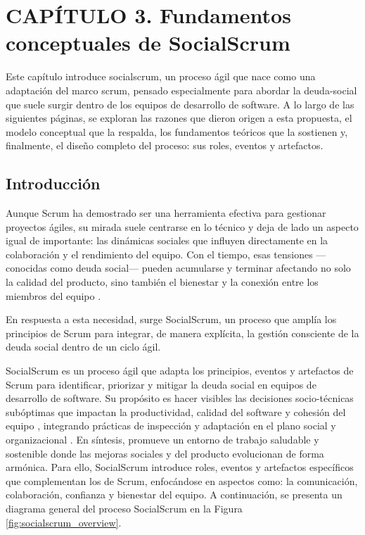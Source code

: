 \chapter*{CAPÍTULO 3. Fundamentos conceptuales de SocialScrum}
\setcounter{chapter}{3}
\setcounter{section}{0}
\setcounter{subsection}{0}
\setcounter{subsubsection}{0}
\setcounter{figure}{0}
\setcounter{table}{0}
\renewcommand{\thesection}{\thechapter.\arabic{section}}
\renewcommand{\thesubsection}{\thesection.\arabic{subsection}}
\renewcommand{\thesubsubsection}{\thesubsection.\arabic{subsubsection}}
\makeatletter
\protected@edef\@currentlabel{\thechapter}%
\makeatother
\label{chap:capitulo3}

Este capítulo introduce \gls{socialscrum}, un proceso ágil que nace como una adaptación del marco \gls{scrum}, pensado especialmente para abordar la \gls{deuda-social} que suele surgir dentro de los equipos de desarrollo de software.
A lo largo de las siguientes páginas, se exploran las razones que dieron origen a esta propuesta, el modelo conceptual que la respalda, los fundamentos teóricos que la sostienen y, finalmente, el diseño completo del proceso: sus roles, eventos y artefactos.

\section{Introducción}
\label{sec:introduccion-teorica-socialscrum}

Aunque Scrum ha demostrado ser una herramienta efectiva para gestionar proyectos ágiles, su mirada suele centrarse en lo técnico y deja de lado un aspecto igual de importante: las dinámicas sociales que influyen directamente en la colaboración y el rendimiento del equipo. Con el tiempo, esas tensiones —conocidas como deuda social— pueden acumularse y terminar afectando no solo la calidad del producto, sino también el bienestar y la conexión entre los miembros del equipo \cite{tamburri2013socialdebt}.

En respuesta a esta necesidad, surge SocialScrum, un proceso que amplía los principios de Scrum para integrar, de manera explícita, la gestión consciente de la deuda social dentro de un ciclo ágil.

SocialScrum es un proceso ágil que adapta los principios, eventos y artefactos de Scrum para identificar, priorizar y mitigar la deuda social en equipos de desarrollo de software. Su propósito es hacer visibles las decisiones socio-técnicas subóptimas que impactan la productividad, calidad del software y cohesión del equipo \cite{tamburri2013socialdebt}, integrando prácticas de inspección y adaptación en el plano social y organizacional \cite{saeeda2024nontechnicaldebt}. En síntesis, promueve un entorno de trabajo saludable y sostenible donde las mejoras sociales y del producto evolucionan de forma armónica. Para ello, SocialScrum introduce roles, eventos y artefactos específicos que complementan los de Scrum, enfocándose en aspectos como: la comunicación, colaboración, confianza y bienestar del equipo. A continuación, se presenta un diagrama general del proceso SocialScrum en la Figura \ref{fig:socialscrum_overview}.

